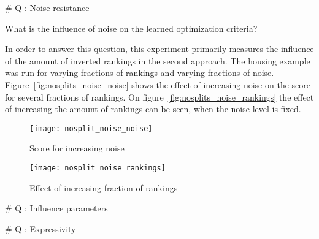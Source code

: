 
\# Q : Noise resistance

\begin{question}
	What is the influence of noise on the learned optimization criteria?
\end{question}

\begin{experiment}
	In order to answer this question, this experiment primarily measures the influence of the amount of inverted rankings in the second approach.
	The housing example was run for varying fractions of rankings and varying fractions of noise.
	Figure~\ref{fig:nosplits_noise_noise} shows the effect of increasing noise on the score for several fractions of rankings.
	On figure~\ref{fig:nosplits_noise_rankings} the effect of increasing the amount of rankings can be seen, when the noise level is fixed.

	\begin{figure}

		\caption{Score for increasing noise}
		\centering
			\texttt{[image: nosplit\_noise\_noise]}
		\label{fig:nosplit_noise_noise}

	\end{figure}

	\begin{figure}

		\caption{Effect of increasing fraction of rankings}
		\centering
			\texttt{[image: nosplit\_noise\_rankings]}
		\label{fig:nosplit_noise_rankings}

	\end{figure}

\end{experiment}


\# Q : Influence parameters

	



\# Q : Expressivity

